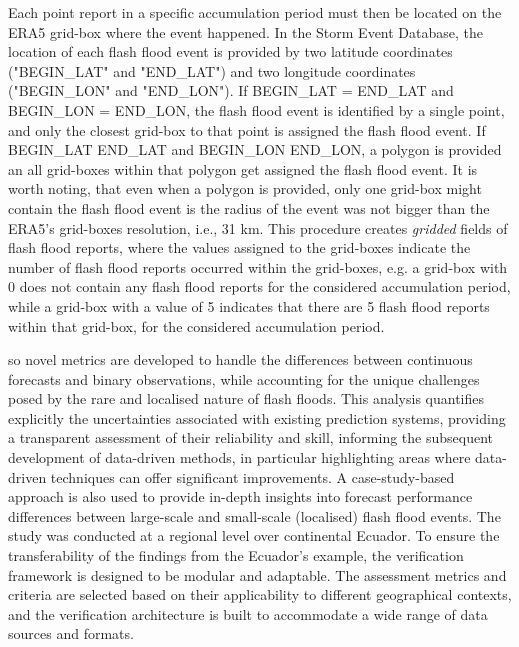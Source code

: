 Each point report in a specific accumulation period must then be located on the ERA5 grid-box where the event happened. In the Storm Event Database, the location of each flash flood event is provided by two latitude coordinates ("BEGIN_LAT" and "END_LAT") and two longitude coordinates ("BEGIN_LON" and "END_LON"). If BEGIN_LAT = END_LAT and BEGIN_LON = END_LON, the flash flood event is identified by a single point, and only the closest grid-box to that point is assigned the flash flood event. If BEGIN_LAT \neq END_LAT and BEGIN_LON \neq END_LON, a polygon is provided an all grid-boxes within that polygon get assigned the flash flood event. It is worth noting, that even when a polygon is provided, only one grid-box might contain the flash flood event is the radius of the event was not bigger than the ERA5's grid-boxes resolution, i.e., 31 km. This procedure creates \textit{gridded} fields of flash flood reports, where the values assigned to the grid-boxes indicate the number of flash flood reports occurred within the grid-boxes, e.g. a grid-box with 0 does not contain any flash flood reports for the considered accumulation period, while a grid-box with a value of 5 indicates that there are 5 flash flood reports within that grid-box, for the considered accumulation period.  





so novel metrics are developed to handle the differences between continuous forecasts and binary observations, while accounting for the unique challenges posed by the rare and localised nature of flash floods. This analysis quantifies explicitly the uncertainties associated with existing prediction systems, providing a transparent assessment of their reliability and skill, informing the subsequent development of data-driven methods, in particular highlighting areas where data-driven techniques can offer significant improvements. A case-study-based approach is also used to provide in-depth insights into forecast performance differences between large-scale and small-scale (localised) flash flood events. The study was conducted at a regional level over continental Ecuador. To ensure the transferability of the findings from the Ecuador's example, the verification framework is designed to be modular and adaptable. The assessment metrics and criteria are selected based on their applicability to different geographical contexts, and the verification architecture is built to accommodate a wide range of data sources and formats. 

